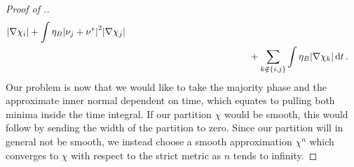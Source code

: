 \begin{proof}[Proof of .]
\begin{align}
		\abs{ \nabla \chi_{ i } }
		\notag
		+
		\int
		\eta_{ B }
		\abs{ \nu_{ j } + \nu^{ \ast } }^{ 2 }
		\abs{ \nabla \chi_{ j } }
		\\
		\label{error_for _convergence_of_velocity}
		& \qquad \qquad \qquad \qquad \qquad \qquad \quad
		+ 
		\sum_{ k \notin \{ i , j \} }
		\int
		\eta_{ B }
		\abs{ \nabla \chi_{ k } }
		\dd{ t }.
	\end{align}
	Our problem is now that we would like to take the majority phase and the
	approximate inner normal dependent on time, which equates to pulling both 
	minima inside the time integral. If our partition $ \chi $ would be smooth, 
	this would follow by sending the width of the partition to zero. 
	Since our partition will in general not be smooth, we instead choose a 
	smooth approximation $ \chi^{ n } $ 
	which converges to $ \chi $ with respect to the strict metric as $ n $ 
	tends to infinity. 
	

\end{proof}
